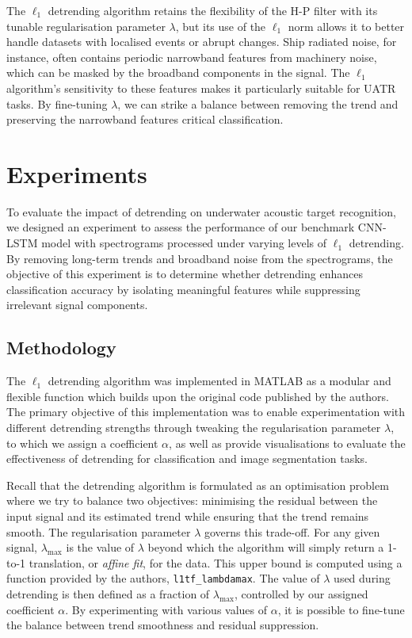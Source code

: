 The $\ell_1$ detrending algorithm retains the flexibility of the H-P filter with its tunable regularisation parameter $\lambda$, but its use of the $\ell_1$ norm allows it to better handle datasets with localised events or abrupt changes. Ship radiated noise, for instance, often contains periodic narrowband features from machinery noise, which can be masked by the broadband components in the signal. The $\ell_1$ algorithm’s sensitivity to these features makes it particularly suitable for UATR tasks. By fine-tuning $\lambda$, we can strike a balance between removing the trend and preserving the narrowband features critical classification.

\section{Experiments}

To evaluate the impact of detrending on underwater acoustic target recognition, we designed an experiment to assess the performance of our benchmark CNN-LSTM model with spectrograms processed under varying levels of $\ell_1$ detrending. By removing long-term trends and broadband noise from the spectrograms, the objective of this experiment is to determine whether detrending enhances classification accuracy by isolating meaningful features while suppressing irrelevant signal components. 

\subsection{Methodology}

The $\ell_1$ detrending algorithm was implemented in MATLAB as a modular and flexible function which builds upon the original code published by the authors. The primary objective of this implementation was to enable experimentation with different detrending strengths through tweaking the regularisation parameter $\lambda$, to which we assign a coefficient $\alpha$, as well as provide visualisations to evaluate the effectiveness of detrending for classification and image segmentation tasks.

Recall that the detrending algorithm is formulated as an optimisation problem where we try to balance two objectives: minimising the residual between the input signal and its estimated trend while ensuring that the trend remains smooth. The regularisation parameter $\lambda$ governs this trade-off. For any given signal, $\lambda_{\text{max}}$ is the value of $\lambda$ beyond which the algorithm will simply return a 1-to-1 translation, or \textit{affine fit}, for the data. This upper bound is computed using a function provided by the authors, \texttt{l1tf\_lambdamax}. The value of $\lambda$ used during detrending is then defined as a fraction of $\lambda_{\text{max}}$, controlled by our assigned coefficient $\alpha$. By experimenting with various values of $\alpha$, it is possible to fine-tune the balance between trend smoothness and residual suppression.

